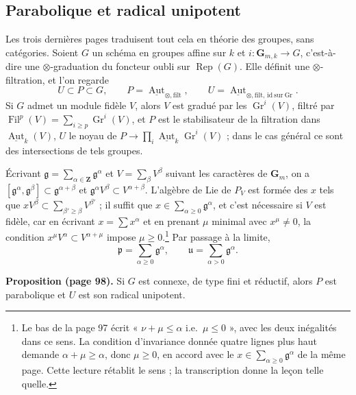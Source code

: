 \documentclass[11pt,a4paper]{article}
\begin{document}
\subsection*{Parabolique et radical unipotent}

Les trois dernières pages traduisent tout cela en théorie des groupes, sans
catégories. Soient $G$ un schéma en groupes affine sur $k$ et $i \colon
\mathbf{G}_{m,k} \to G$, c'est-à-dire une $\otimes$-graduation du foncteur
oubli sur $\operatorname{Rep}(G)$. Elle définit une $\otimes$-filtration, et
l'on regarde
\[
U \subset P \subset G ,
\qquad
P = \underline{\operatorname{Aut}}_{\otimes,\mathrm{filt}} ,
\qquad
U = \underline{\operatorname{Aut}}_{\otimes,\mathrm{filt},\,\mathrm{id\ sur\ Gr}} .
\]
Si $G$ admet un module fidèle $V$, alors $V$ est gradué par les
$\operatorname{Gr}^{i}(V)$, filtré par $\operatorname{Fil}^{p}(V) = \sum_{i
\geqslant p}\operatorname{Gr}^{i}(V)$, et $P$ est le stabilisateur de la
filtration dans $\underline{\operatorname{Aut}}_{k}(V)$, $U$ le noyau de
$P \to \prod_{i}\underline{\operatorname{Aut}}_{k}\operatorname{Gr}^{i}(V)$ ;
dans le cas général ce sont des intersections de tels groupes.

Écrivant $\mathfrak{g} = \sum_{\alpha \in \mathbf{Z}}\mathfrak{g}^{\alpha}$ et
$V = \sum_{\beta}V^{\beta}$ suivant les caractères de $\mathbf{G}_{m}$, on a
$[\mathfrak{g}^{\alpha}, \mathfrak{g}^{\beta}] \subset
\mathfrak{g}^{\alpha+\beta}$ et $\mathfrak{g}^{\alpha}V^{\beta} \subset
V^{\alpha+\beta}$. L'algèbre de Lie de $P_{V}$ est formée des $x$ tels que
$xV^{\beta} \subset \sum_{\beta' \geqslant \beta}V^{\beta'}$ ; il suffit que
$x \in \sum_{\alpha \geqslant 0}\mathfrak{g}^{\alpha}$, et c'est nécessaire si
$V$ est fidèle, car en écrivant $x = \sum x^{\alpha}$ et en prenant $\mu$
minimal avec $x^{\mu} \neq 0$, la condition $x^{\mu}V^{\alpha} \subset
V^{\alpha+\mu}$ impose $\mu \geqslant 0$.\footnote{Le bas de la page 97 écrit
« $\nu + \mu \leqslant \alpha$ i.e.\ $\mu \leqslant 0$ », avec les deux
inégalités dans ce sens. La condition d'invariance donnée quatre lignes plus
haut demande $\alpha + \mu \geqslant \alpha$, donc $\mu \geqslant 0$, en accord
avec le $x \in \sum_{\alpha \geqslant 0}\mathfrak{g}^{\alpha}$ de la même page.
Cette lecture rétablit le sens ; la transcription donne la leçon telle
quelle.} Par passage à la limite,
\[
\mathfrak{p} = \sum_{\alpha \geqslant 0}\mathfrak{g}^{\alpha} ,
\qquad
\mathfrak{u} = \sum_{\alpha > 0}\mathfrak{g}^{\alpha} .
\]

\textbf{Proposition (page 98).} Si $G$ est connexe, de type fini et réductif,
alors $P$ est parabolique et $U$ est son radical unipotent.
\end{document}
